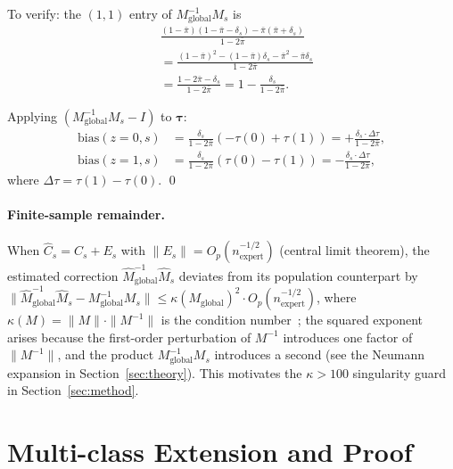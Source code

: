 To verify: the $(1,1)$ entry of $M_{\text{global}}^{-1} M_s$ is
{\small
\begin{align}
&\frac{(1{-}\bar{\pi})(1{-}\bar{\pi}{-}\delta_s) - \bar{\pi}(\bar{\pi}{+}\delta_s)}{1-2\bar{\pi}} \nonumber\\
&= \frac{(1{-}\bar{\pi})^2 - (1{-}\bar{\pi})\delta_s - \bar{\pi}^2 - \bar{\pi}\delta_s}{1-2\bar{\pi}} \nonumber\\
&= \frac{1 - 2\bar{\pi} - \delta_s}{1-2\bar{\pi}} = 1 - \frac{\delta_s}{1-2\bar{\pi}}.
\end{align}
}

Applying $(M_{\text{global}}^{-1} M_s - I)$ to $\boldsymbol{\tau}$:
{\small
\begin{align}
\text{bias}(z{=}0, s) &= \tfrac{\delta_s}{1-2\bar{\pi}}(-\tau(0) + \tau(1)) = +\tfrac{\delta_s \cdot \Delta\tau}{1-2\bar{\pi}}, \\
\text{bias}(z{=}1, s) &= \tfrac{\delta_s}{1-2\bar{\pi}}(\tau(0) - \tau(1)) = -\tfrac{\delta_s \cdot \Delta\tau}{1-2\bar{\pi}},
\end{align}
}
where $\Delta\tau = \tau(1) - \tau(0)$. \qed

\paragraph{Finite-sample remainder.}
When $\hat{C}_s = C_s + E_s$ with $\|E_s\| = O_p(n_{\text{expert}}^{-1/2})$ (central limit theorem), the estimated correction $\hat{M}_{\text{global}}^{-1} \hat{M}_s$ deviates from its population counterpart by
$\|\hat{M}_{\text{global}}^{-1} \hat{M}_s - M_{\text{global}}^{-1} M_s\| \leq \kappa(M_{\text{global}})^2 \cdot O_p(n_{\text{expert}}^{-1/2})$,
where $\kappa(M) = \|M\| \cdot \|M^{-1}\|$ is the condition number~\citep{stewart1990matrix}; the squared exponent arises because the first-order perturbation of $M^{-1}$ introduces one factor of $\|M^{-1}\|$, and the product $M_{\text{global}}^{-1} M_s$ introduces a second (see the Neumann expansion in Section~\ref{sec:theory}).
This motivates the $\kappa > 100$ singularity guard in Section~\ref{sec:method}.

\section{Multi-class Extension and Proof}
\label{app:multiclass}

